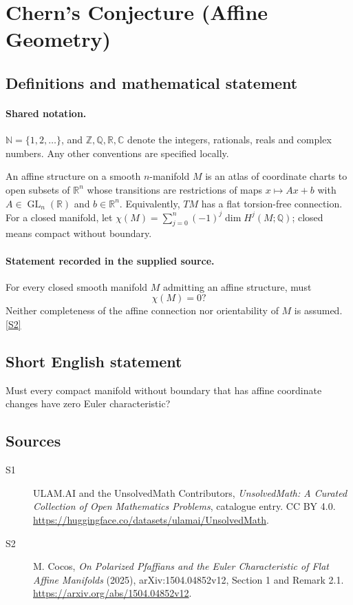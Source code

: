 \documentclass[11pt]{article}
\newcommand{\sref}[2]{\hyperlink{source:#1:#2}{[S#2]}}
\begin{document}
\section{Chern's Conjecture (Affine Geometry)}\label{statement}

\subsection{Definitions and mathematical statement}

\paragraph{Shared notation.}$\mathbb N=\{1,2,\ldots\}$, and $\mathbb Z,\mathbb Q,\mathbb R,\mathbb C$ denote the integers, rationals, reals and complex numbers. Any other conventions are specified locally.


An affine structure on a smooth $n$-manifold $M$ is an atlas of coordinate charts to open subsets of $\mathbb R^n$ whose transitions are restrictions of maps $x\mapsto Ax+b$ with $A\in\operatorname{GL}_n(\mathbb R)$ and $b\in\mathbb R^n$. Equivalently, $TM$ has a flat torsion-free connection. For a closed manifold, let $\chi(M)=\sum_{j=0}^{n}(-1)^j\dim H^j(M;\mathbb Q)$; closed means compact without boundary.
\paragraph{Statement recorded in the supplied source.}
For every closed smooth manifold $M$ admitting an affine structure, must
\[
 \chi(M)=0?
\]
Neither completeness of the affine connection nor orientability of $M$ is assumed. \sref{statement}{2}
\subsection{Short English statement}
Must every compact manifold without boundary that has affine coordinate changes have zero Euler characteristic?
\subsection{Sources}
\begin{description}
\item[\hypertarget{source:statement:1}{S1}] ULAM.AI and the UnsolvedMath Contributors, \emph{UnsolvedMath: A Curated Collection of Open Mathematics Problems}, catalogue entry. CC BY 4.0. \url{https://huggingface.co/datasets/ulamai/UnsolvedMath}.
\item[\hypertarget{source:statement:2}{S2}] M. Cocos, \emph{On Polarized Pfaffians and the Euler Characteristic of Flat Affine Manifolds} (2025), arXiv:1504.04852v12, Section 1 and Remark 2.1. \url{https://arxiv.org/abs/1504.04852v12}.
\end{description}
\label{end:statement}
\end{document}
